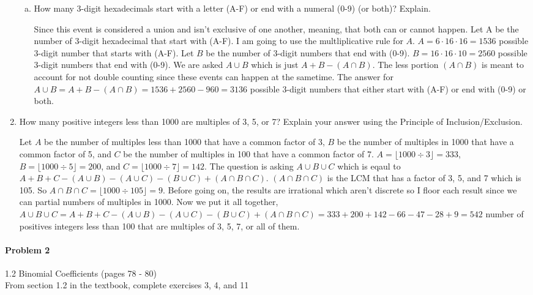 \documentclass[11pt, a4paper]{article}
\newcommand\setItemNumber[1]{\setcounter{enumi}{\numexpr#1-1\relax}}
\begin{document}
\begin{enumerate}
\begin{enumerate}[(a)]
            \item How many 3-digit hexadecimals start with a letter (A-F) or end with a numeral (0-9) (or both)? Explain.

                Since this event is considered a union and isn't exclusive of one another, meaning, that both can or cannot happen. Let A be the number of 3-digit hexadecimal that start with (A-F). I am going to use the multliplicative rule for $A$. $A = 6 \cdot 16 \cdot 16 = 1536$ possible 3-digit number that starts with (A-F). Let $B$ be the number of 3-digit numbers that end with (0-9). $B = 16 \cdot 16 \cdot 10 = 2560$ possible 3-digit numbers that end with (0-9). We are asked $A \cup B$ which is just $A + B - (A \cap B)$. The less portion $(A \cap B)$ is meant to account for not double counting since these events can happen at the sametime. The answer for $A \cup B = A + B - (A\cap B) = 1536 + 2560 - 960 = 3136$ possible 3-digit numbers that either start with (A-F) or end with (0-9) or both.
        

        \end{enumerate}

        \setItemNumber{10}
        \item How many positive integers less than 1000 are multiples of 3, 5, or 7? Explain your answer using the Principle of Inclusion/Exclusion.

            Let $A$ be the number of multiples less than 1000 that have a common factor of 3, $B$ be the number of multiples in 1000 that have a common factor of 5, and $C$ be the number of multiples in 100 that have a common factor of 7. $A = \lfloor 1000 \div 3 \rfloor = 333$, $B = \lfloor 1000 \div 5 \rfloor = 200$, and $C = \lfloor 1000 \div 7 \rfloor = 142$. The question is asking $A \cup B \cup C$ which is eqaul to $A + B + C - (A\cup B) - (A\cup C) - (B\cup C) + (A\cap B \cap C)$. $(A\cap B \cap C)$ is the LCM that has a factor of 3, 5, and 7 which is 105. So $A\cap B\cap C = \lfloor 1000\div 105\rfloor = 9$. Before going on, the results are irrational which aren't discrete so I floor each result since we can partial numbers of multiples in 1000. Now we put it all together, $ A\cup B\cup C = A + B + C - (A\cup B) - (A\cup C) - (B\cup C) + (A\cap B \cap C) = 333 + 200 + 142 - 66 - 47 - 28 + 9 = 542$ number of positives integers less than 100 that are multiples of 3, 5, 7, or all of them.

    \end{enumerate}
	
	\paragraph{Problem 2} 1.2 Binomial Coefficients  (pages 78 - 80)\\
	From section 1.2 in the textbook, complete exercises 3, 4, and 11
\end{document}
